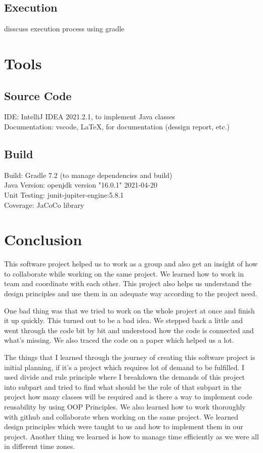\documentclass[12pt, dvipsnames, a4paper]{article}
\begin{document}
\subsection{Execution}
disscuss execution process using gradle
\section{Tools}
\subsection{Source Code}
IDE: IntelliJ IDEA 2021.2.1, to implement Java classes\\
Documentation: vscode, \LaTeX, for documentation (dessign report, etc.)
\subsection{Build}
Build: Gradle 7.2 (to manage dependencies and build)\\
Java Version: openjdk version "16.0.1" 2021-04-20\\
Unit Testing: junit-jupiter-engine:5.8.1\\
Coverage: JaCoCo library
\section{Conclusion}

This software project helped us to work as a group and also get an insight of how to collaborate while working on the same project. We learned how to work in team and coordinate with each other. This project also helps us understand the design principles and use them in an adequate way according to the project need. 

One bad thing was that we tried to work on the whole project at once and finish it up quickly. This turned out to be a bad idea. We stepped back a little and went through the code bit by bit and understood how the code is connected and what’s missing. We also traced the code on a paper which helped us a lot. 

The things that I learned through the journey of creating this software project is initial planning, if it’s a project which requires lot of demand to be fulfilled. I used divide and rule principle where I breakdown the demands of this project into subpart and tried to find what should be the role of that subpart in the project how many classes will be required and is there a way to implement code reusability by using OOP Principles. We also learned how to work thoroughly with github and collaborate when working on the same project. We learned design principles which were taught to us and how to implement them in our project. Another thing we learned is how to manage time efficiently as we were all in different time zones. 
\end{document}
